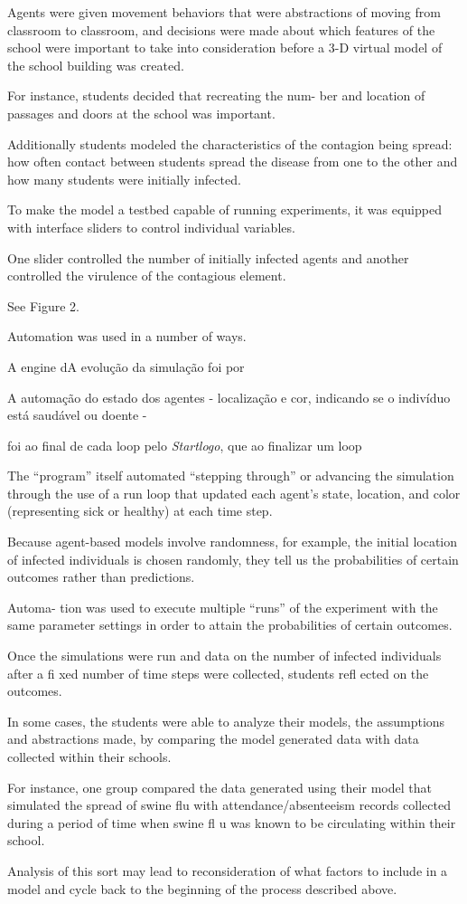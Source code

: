 Agents were given movement behaviors that were abstractions of moving from classroom to classroom, and decisions were made about which features of the school were important to take into consideration before a 3-D virtual model of the school building was created.

For instance, students decided that recreating the num- ber and location of passages and doors at the school was important.

Additionally students modeled the characteristics of the contagion being spread: how often contact between students spread the disease from one to the other and how many students were initially infected.

To make the model a testbed capable of running experiments, it was equipped with interface sliders to control individual variables.

One slider controlled the number of initially infected agents and another controlled the virulence of the contagious element.

See Figure 2.

Automation was used in a number of ways.

 

A engine dA evolução da simulação foi  por 

A automação do estado dos agentes - localização e cor, indicando se o indivíduo está saudável ou doente - 




foi ao final de cada loop pelo \textit{Startlogo}, que ao finalizar um loop 



The “program” itself automated “stepping through” or advancing the simulation through the use of a run loop that updated each agent’s state, location, and color (representing sick or healthy) at each time step.

Because agent-based models involve randomness, for example, the initial location of infected individuals is chosen randomly, they tell us the probabilities of certain outcomes rather than predictions.

Automa- tion was used to execute multiple “runs” of the experiment with the same parameter settings in order to attain the probabilities of certain outcomes.

Once the simulations were run and data on the number of infected individuals after a fi xed number of time steps were collected, students refl ected on the outcomes.

In some cases, the students were able to analyze their models, the assumptions and abstractions made, by comparing the model generated data with data collected within their schools.

For instance, one group compared the data generated using their model that simulated the spread of swine flu with attendance/absenteeism records collected during a period of time when swine fl u was known to be circulating within their school.

Analysis of this sort may lead to reconsideration of what factors to include in a model and cycle back to the beginning of the process described above.

